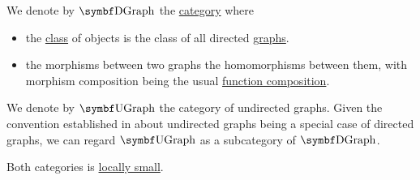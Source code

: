 \begin{definition}\label{def:category_of_graphs}
  We denote by \( \Cat{DGraph} \) the \hyperref[def:category]{category} where
  \begin{itemize}
    \item the \hyperref[def:set_zfc]{class} of objects is the class of all directed \hyperref[def:directed_graph]{graphs}.
    \item the morphisms between two graphs the homomorphisms between them, with morphism composition being the usual \hyperref[def:function/composition]{function composition}.
  \end{itemize}

  We denote by \( \Cat{UGraph} \) the category of undirected graphs. Given the convention established in  about undirected graphs being a special case of directed graphs, we can regard \( \Bold{UGraph} \) as a subcategory of \( \Bold{DGraph} \).

  Both categories is \hyperref[def:category_cardinality]{locally small}.
\end{definition}
